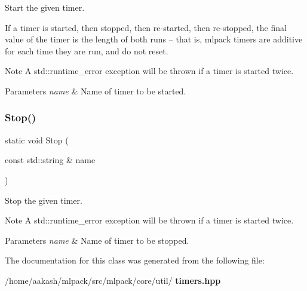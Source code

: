 Start the given timer. 

If a timer is started, then stopped, then re-\/started, then re-\/stopped, the final value of the timer is the length of both runs -- that is, mlpack timers are additive for each time they are run, and do not reset.

\begin{DoxyNote}{Note}
A std\+::runtime\+\_\+error exception will be thrown if a timer is started twice.
\end{DoxyNote}

\begin{DoxyParams}{Parameters}
{\em name} & Name of timer to be started. \\
\hline
\end{DoxyParams}
\mbox{\label{classmlpack_1_1Timer_ad5249f0e0368bf00dbd1bd6570160950}} 
\subsubsection{Stop()}
{\footnotesize\ttfamily static void Stop (\begin{DoxyParamCaption}\item[{const std\+::string \&}]{name }\end{DoxyParamCaption})\hspace{0.3cm}{\ttfamily [static]}}



Stop the given timer. 

\begin{DoxyNote}{Note}
A std\+::runtime\+\_\+error exception will be thrown if a timer is started twice.
\end{DoxyNote}

\begin{DoxyParams}{Parameters}
{\em name} & Name of timer to be stopped. \\
\hline
\end{DoxyParams}


The documentation for this class was generated from the following file\+:\begin{DoxyCompactItemize}
\item 
/home/aakash/mlpack/src/mlpack/core/util/\textbf{ timers.\+hpp}\end{DoxyCompactItemize}
